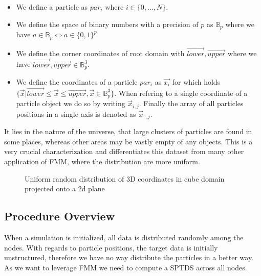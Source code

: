 \documentclass[]{article}
\begin{document}
\begin{itemize}
	\item We define a particle as $par_i$  where $i \in \{0,...,N\}$. 
	\item We define the space of binary numbers with a precision of $p$ as $\mathbb{B}_p$ where we have $a \in \mathbb{B}_p \Leftrightarrow a \in \{0,1\}^{p}$
	\item We define the corner coordinates of root domain with $\vec{lower}, \vec{upper}$ where we have $\vec{lower}, \vec{upper} \in \mathbb{B}_p^3$. 
	\item We define the coordinates of a particle $par_i$ as $\vec{x_i}$ for which holds $\{\vec{x} | \vec{lower} \leq \vec{x} \leq \vec{upper}, \vec{x} \in \mathbb{B}_p^3 \}$.
	When refering to a single coordinate of a particle object we do so by writing $\vec{x}_{i,j}$. Finally the array of all particles positions in a single axis is denoted as $\vec{x}_{:,j}$. 
	
\end{itemize}

It lies in the nature of the universe, that large clusters of particles are found in some places, whereas other areas may be vastly empty of any objects. This is a very crucial characterization and differentiates this dataset from many other application of FMM, where the distribution are more uniform.

\begin{figure}[H]
	\begin{center}
	\end{center}
	\caption{Uniform random distribution of 3D coordinates in cube domain projected onto a 2d plane}
\end{figure}

\subsection{Procedure Overview}

When a simulation is initialized, all data is distributed randomly among the nodes. With regards to particle positions, the target data is initially unstructured, therefore we have no way distribute the particles in a better way. As we want to leverage FMM we need to compute a SPTDS across all nodes. 
\end{document}
